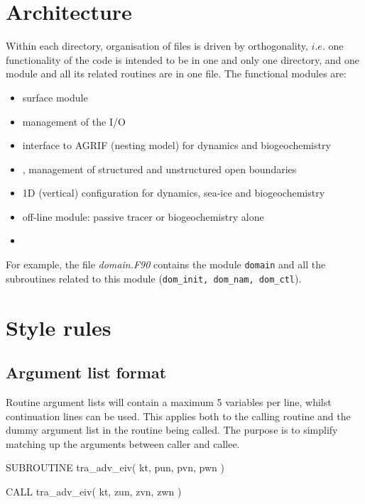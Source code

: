 \section{Architecture}

Within each directory, organisation of files is driven by orthogonality,
$i.e.$ one functionality of the code is intended to be in one and only one directory, and
one module and all its related routines are in one file.
The functional modules are:

\begin{itemize}
\item {}             surface module
\item {}             management of the I/O
\item {}             interface to AGRIF (nesting model) for dynamics and biogeochemistry
\item {},  management of structured and unstructured open boundaries
\item {}             1D (vertical) configuration for dynamics, sea-ice and biogeochemistry
\item {}             off-line module: passive tracer or biogeochemistry alone
\item {}
\end{itemize}

For example, the file \textit{domain.F90} contains the module \texttt{domain} and all the subroutines related to
this module (\texttt{dom\_init, dom\_nam, dom\_ctl}).

\section{Style rules}

\subsection{Argument list format}

Routine argument lists will contain a maximum 5 variables per line,
whilst continuation lines can be used.
This applies both to the calling routine and the dummy argument list in the routine being called.
The purpose is to simplify matching up the arguments between caller and callee.

\begin{forlines}
SUBROUTINE tra_adv_eiv( kt, pun, pvn, pwn )

      CALL tra_adv_eiv( kt, zun, zvn, zwn )
\end{forlines}

